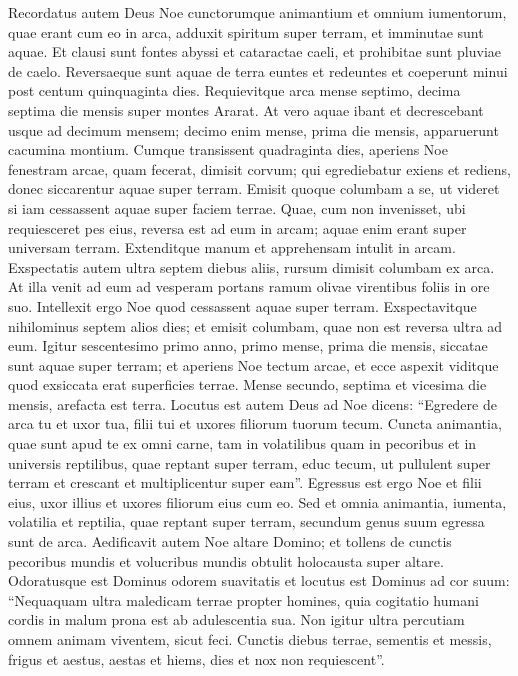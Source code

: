 \begin{biblechapter}
\begin{biblechapter}
\begin{biblechapter}
\begin{biblechapter}
\begin{biblechapter}
\begin{biblechapter}
\begin{biblechapter}
\begin{biblechapter}
\verse Recordatus autem Deus Noe cunctorumque animantium et omnium iumentorum, quae erant cum eo in arca, adduxit spiritum super terram, et imminutae sunt aquae. 
\verse Et clausi sunt fontes abyssi et cataractae caeli, et prohibitae sunt pluviae de caelo. 
\verse Reversaeque sunt aquae de terra euntes et redeuntes et coeperunt minui post centum quinquaginta dies. 
\verse Requievitque arca mense septimo, decima septima die mensis super montes Ararat. 
\verse At vero aquae ibant et decrescebant usque ad decimum mensem; decimo enim mense, prima die mensis, apparuerunt cacumina montium.
 \verse Cumque transissent quadraginta dies, aperiens Noe fenestram arcae, quam fecerat, dimisit corvum; 
\verse qui egrediebatur exiens et rediens, donec siccarentur aquae super terram. 
\verse Emisit quoque columbam a se, ut videret si iam cessassent aquae super faciem terrae. 
\verse Quae, cum non invenisset, ubi requiesceret pes eius, reversa est ad eum in arcam; aquae enim erant super universam terram. Extenditque manum et apprehensam intulit in arcam. 
\verse Exspectatis autem ultra septem diebus aliis, rursum dimisit columbam ex arca. 
 \verse At illa venit ad eum ad vesperam portans ramum olivae virentibus foliis in ore suo. Intellexit ergo Noe quod cessassent aquae super terram. 
\verse Exspectavitque nihilominus septem alios dies; et emisit columbam, quae non est reversa ultra ad eum.
 \verse Igitur sescentesimo primo anno, primo mense, prima die mensis, siccatae sunt aquae super terram; et aperiens Noe tectum arcae, et ecce aspexit viditque quod exsiccata erat superficies terrae. 
\verse Mense secundo, septima et vicesima die mensis, arefacta est terra.
 \verse Locutus est autem Deus ad Noe dicens: 
\verse “Egredere de arca tu et uxor tua, filii tui et uxores filiorum tuorum tecum. 
\verse Cuncta animantia, quae sunt apud te ex omni carne, tam in volatilibus quam in pecoribus et in universis reptilibus, quae reptant super terram, educ tecum, ut pullulent super terram et crescant et multiplicentur super eam”. 
\verse Egressus est ergo Noe et filii eius, uxor illius et uxores filiorum eius cum eo. 
\verse Sed et omnia animantia, iumenta, volatilia et reptilia, quae reptant super terram, secundum genus suum egressa sunt de arca.
 \verse Aedificavit autem Noe altare Domino; et tollens de cunctis pecoribus mundis et volucribus mundis obtulit holocausta super altare. 
\verse Odoratusque est Dominus odorem suavitatis et locutus est Dominus ad cor suum: “Nequaquam ultra maledicam terrae propter homines, quia cogitatio humani cordis in malum prona est ab adulescentia sua. Non igitur ultra percutiam omnem animam viventem, sicut feci. 
\verse Cunctis diebus terrae, sementis et messis, frigus et aestus, aestas et hiems, dies et nox non requiescent”.
 

\end{biblechapter}
\end{biblechapter}
\end{biblechapter}
\end{biblechapter}
\end{biblechapter}
\end{biblechapter}
\end{biblechapter}
\end{biblechapter}
